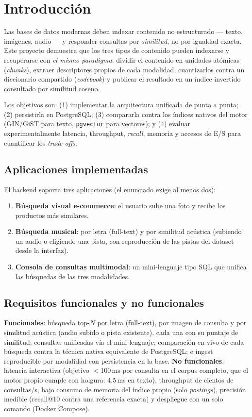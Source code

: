 \documentclass[conference]{IEEEtran}
\begin{document}
\section{Introducción}

Las bases de datos modernas deben indexar contenido no estructurado ---
texto, imágenes, audio --- y responder consultas por \emph{similitud}, no por
igualdad exacta. Este proyecto demuestra que los tres tipos de contenido
pueden indexarse y recuperarse con \emph{el mismo paradigma}: dividir el
contenido en unidades atómicas (\textit{chunks}), extraer descriptores
propios de cada modalidad, cuantizarlos contra un diccionario compartido
(\textit{codebook}) y publicar el resultado en un índice invertido consultado
por similitud coseno.

Los objetivos son: (1) implementar la arquitectura unificada de punta a punta;
(2) persistirla en PostgreSQL; (3) compararla contra los índices nativos del
motor (GIN/GiST para texto, \texttt{pgvector} para vectores); y (4) evaluar
experimentalmente latencia, throughput, \textit{recall}, memoria y accesos de
E/S para cuantificar los \textit{trade-offs}.

\subsection{Aplicaciones implementadas}
El backend soporta tres aplicaciones (el enunciado exige al menos dos):
\begin{enumerate}
  \item \textbf{Búsqueda visual e-commerce}: el usuario sube una foto y
        recibe los productos más similares.
  \item \textbf{Búsqueda musical}: por letra (full-text) y por similitud
        acústica (subiendo un audio o eligiendo una pista, con reproducción
        de las pistas del dataset desde la interfaz).
  \item \textbf{Consola de consultas multimodal}: un mini-lenguaje tipo SQL
        que unifica las búsquedas de las tres modalidades.
\end{enumerate}

\subsection{Requisitos funcionales y no funcionales}
\textbf{Funcionales}: búsqueda top-$N$ por letra (full-text), por imagen de
consulta y por similitud acústica (audio subido o pista existente), cada una
con su puntaje de similitud; consultas unificadas vía el mini-lenguaje;
comparación en vivo de cada búsqueda contra la técnica nativa equivalente de
PostgreSQL; e ingest reproducible por modalidad con persistencia en la base.
\textbf{No funcionales}: latencia interactiva (objetivo $<$100\,ms por
consulta en el corpus completo, que el motor propio cumple con holgura:
4.5\,ms en texto), throughput de cientos de consultas/s, bajo consumo de
memoria del índice propio (solo \textit{postings}), precisión medible
(recall@10 contra una referencia exacta) y despliegue con un solo comando
(Docker Compose).
\end{document}
